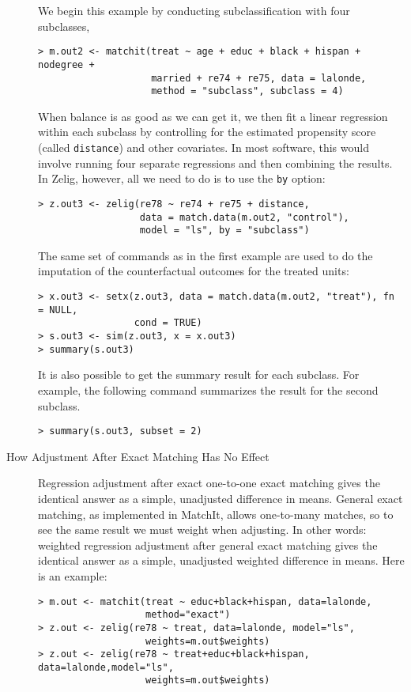 \begin{description}
  We begin this example by conducting subclassification with four
  subclasses,
\begin{verbatim}
> m.out2 <- matchit(treat ~ age + educ + black + hispan + nodegree + 
                    married + re74 + re75, data = lalonde, 
                    method = "subclass", subclass = 4)
\end{verbatim}
  When balance is as good as we can get it, we then fit a linear
  regression within each subclass by controlling for the estimated
  propensity score (called \texttt{distance}) and other covariates.
  In most software, this would involve running four separate
  regressions and then combining the results.  In Zelig, however, all
  we need to do is to use the {\tt by} option:
\begin{verbatim}
> z.out3 <- zelig(re78 ~ re74 + re75 + distance, 
                  data = match.data(m.out2, "control"), 
                  model = "ls", by = "subclass")
\end{verbatim}
  The same set of commands as in the first example are used to do the
  imputation of the counterfactual outcomes for the treated units:
\begin{verbatim}
> x.out3 <- setx(z.out3, data = match.data(m.out2, "treat"), fn = NULL, 
                 cond = TRUE)
> s.out3 <- sim(z.out3, x = x.out3)
> summary(s.out3)
\end{verbatim}
It is also possible to get the summary result for each subclass. For
example, the following command summarizes the result for the second
subclass.
\begin{verbatim}
> summary(s.out3, subset = 2)
\end{verbatim}
  
\item[How Adjustment After Exact Matching Has No Effect] Regression 
adjustment after exact one-to-one exact matching gives the identical 
answer as a simple, unadjusted difference in means.  General exact 
matching, as implemented in MatchIt, allows one-to-many matches, so to see 
the same result we must weight when adjusting.  In other words: weighted 
regression adjustment after general exact matching gives the identical 
answer as a simple, unadjusted weighted difference in means.  Here is an 
example:

\begin{verbatim}
> m.out <- matchit(treat ~ educ+black+hispan, data=lalonde, 
                   method="exact")
> z.out <- zelig(re78 ~ treat, data=lalonde, model="ls", 
                   weights=m.out$weights)
> z.out <- zelig(re78 ~ treat+educ+black+hispan, data=lalonde,model="ls", 
                   weights=m.out$weights)
\end{verbatim}


 \end{description}


